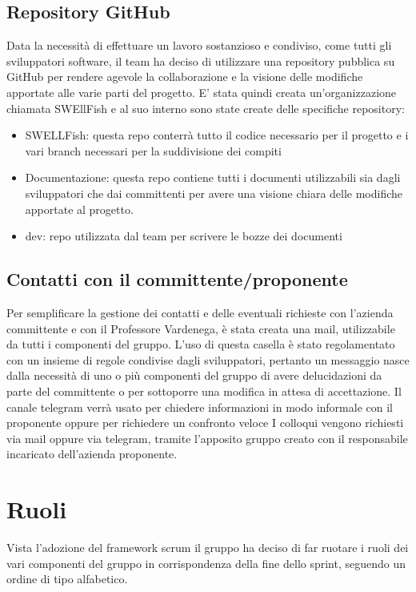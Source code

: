\documentclass[12pt]{article}
\begin{document}
\subsection{Repository GitHub}
Data la necessità di effettuare un lavoro sostanzioso e condiviso, come tutti gli sviluppatori software, il team ha deciso di utilizzare una repository pubblica su GitHub per rendere agevole la collaborazione e la visione delle modifiche apportate alle varie parti del progetto.
E' stata quindi creata un'organizzazione chiamata SWEllFish e al suo interno sono state create delle specifiche repository:

\begin{itemize}
    \item SWELLFish: questa repo conterrà tutto il codice necessario per il progetto e i vari branch necessari per la suddivisione dei compiti
    \item Documentazione: questa repo contiene tutti i documenti utilizzabili sia dagli sviluppatori che dai committenti per avere una visione chiara delle modifiche apportate al progetto.
    \item dev: repo utilizzata dal team per scrivere le bozze dei documenti
\end{itemize}

\subsection{Contatti con il committente/proponente}
Per semplificare la gestione dei contatti e delle eventuali richieste con l'azienda committente e con il Professore Vardenega, è stata creata una mail, \href{swellfish14@gmail.com}{} utilizzabile da tutti i componenti del gruppo.
L'uso di questa casella è stato regolamentato con un insieme di regole condivise dagli sviluppatori, pertanto un messaggio nasce dalla necessità di uno o più componenti del gruppo di avere delucidazioni da parte del committente o per sottoporre una modifica in attesa di accettazione.
Il canale telegram verrà usato per chiedere informazioni in modo informale con il proponente oppure per richiedere un confronto veloce 
I colloqui vengono richiesti via mail oppure via telegram, tramite l'apposito gruppo creato con il responsabile incaricato dell'azienda proponente.




\section{Ruoli}
Vista l'adozione del framework scrum il gruppo ha deciso di far ruotare i ruoli dei vari componenti del gruppo in corrispondenza della fine dello sprint, seguendo un ordine di tipo alfabetico.
\end{document}
